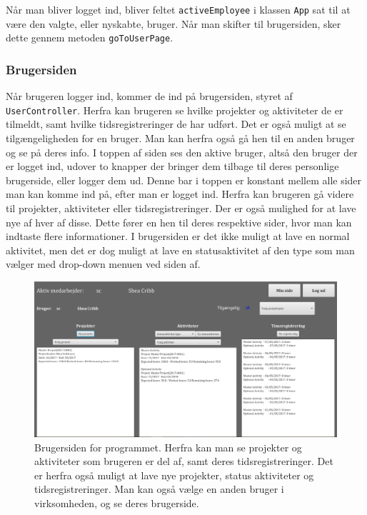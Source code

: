 Når man bliver logget ind, bliver feltet \texttt{activeEmployee} i klassen \texttt{App} sat til at være den valgte, eller nyskabte, bruger. Når man skifter til brugersiden, sker dette gennem metoden \texttt{goToUserPage}. 

\subsubsection{Brugersiden}
Når brugeren logger ind, kommer de ind på brugersiden, styret af \texttt{UserController}. Herfra kan brugeren se hvilke projekter og aktiviteter de er tilmeldt, samt hvilke tidsregistreringer de har udført. Det er også muligt at se tilgængeligheden for en bruger. Man kan herfra også gå hen til en anden bruger og se på deres info. I toppen af siden ses den aktive bruger, altså den bruger der er logget ind, udover to knapper der bringer dem tilbage til deres personlige brugerside, eller logger dem ud. Denne bar i toppen er konstant mellem alle sider man kan komme ind på, efter man er logget ind. Herfra kan brugeren gå videre til projekter, aktiviteter eller tidsregistreringer. Der er også mulighed for at lave nye af hver af disse. Dette fører en hen til deres respektive sider, hvor man kan indtaste flere informationer. I brugersiden er det ikke muligt at lave en normal aktivitet, men det er dog muligt at lave en statusaktivitet af den type som man vælger med drop-down menuen ved siden af. 

\begin{figure}[H]
    \centering
    \includegraphics[width = \textwidth]{Figurer/userPage}
    \caption{Brugersiden for programmet. Herfra kan man se projekter og aktiviteter som brugeren er del af, samt deres tidsregistreringer. Det er herfra også muligt at lave nye projekter, status aktiviteter og tidsregistreringer. Man kan også vælge en anden bruger i virksomheden, og se deres brugerside.}
    \label{fig:userPage}
\end{figure}


